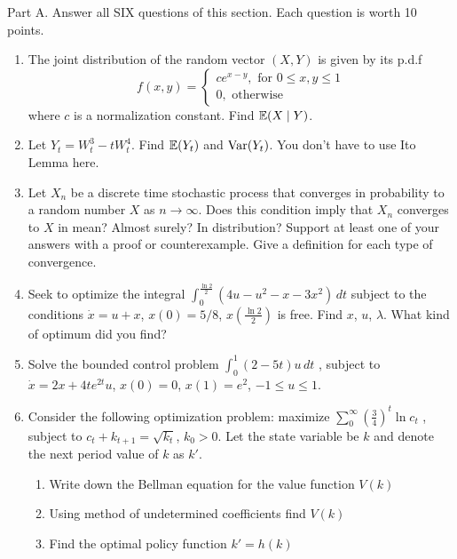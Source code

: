 \documentclass[pdftex,12pt,a4paper]{article}
\begin{document}
Part A.
Answer all SIX questions of this section. Each question is worth 10 points.

\begin{enumerate}
\item  The joint distribution of the random vector $(X,Y)$ is given by its p.d.f 
\[
f(x,y)=
\left\{
  \begin{array}{l}
    c e^{x-y}, \text{ for } 0\leq x,y\leq 1 \\
    0, \text{ otherwise}    
  \end{array}
\right.
\]
where $c$ is a normalization constant. Find $\mathbb{E}(X\mid Y)$.

\item Let $Y_t=W_t^3-tW_t^4$. Find $\mathbb{E}(Y_t)$ and $\operatorname{Var}(Y_t)$.  You don’t have to use Ito Lemma here.
\item Let $X_n$ be a discrete time stochastic process that converges in probability to a random number $X$ as $n\to \infty$. Does this condition imply that $X_n$ converges to $X$ in mean? Almost surely? In distribution? Support at least one of your answers with a proof or counterexample. Give a definition for each type of convergence. 
\item Seek to optimize the integral 
$\int_0^{\frac{\ln 2}{2}} (4u-u^2-x-3x^2)\,dt$
subject to the conditions $\dot{x}=u+x$, $x(0)=5/8$, $x\left(\frac{\ln 2}{2}\right)$ is free. Find $x$, $u$, $\lambda$. What kind of optimum did you find?
\item Solve the bounded control problem 
$\int_0^1 (2-5t)u\,dt$
, subject to $\dot{x}=2x+4te^{2t}u$, $x(0)=0$, $x(1)=e^2$, $-1\leq u\leq 1$.
\item Consider the following optimization problem: maximize 
$\sum_0^{\infty} \left(\frac{3}{4}\right)^t \ln c_t$
, subject to $c_t+k_{t+1}=\sqrt{k_t}$, $k_0>0$. Let the state variable be $k$ and denote the next period value of $k$ as $k'$.
\begin{enumerate}
\item Write down the Bellman equation for the value function $V(k)$
\item Using method of undetermined coefficients find $V(k)$
\item Find the optimal policy function $k'=h(k)$ 
\end{enumerate} 

\end{enumerate}
\end{document}
